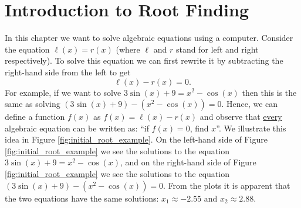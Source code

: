 \section{Introduction to Root Finding}
In this chapter we want to solve algebraic equations using a computer.  Consider the equation
$\ell(x) = r(x)$ (where $\ell$ and $r$ stand for left and right respectively).  To solve
this equation we can first rewrite it by subtracting the right-hand side from the left to
get
\[ \ell(x) - r(x) = 0. \]
For example, if we want to solve $3\sin(x) + 9 = x^2 - \cos(x)$ then this is the same as
solving $(3\sin(x) + 9 ) - (x^2 - \cos(x)) = 0$.  Hence, we can define a function $f(x)$
as $f(x)=\ell(x)-r(x)$
and observe that \underline{every} algebraic equation can be written as: ``if $f(x) = 0$,
find $x$''.  We illustrate this idea in Figure \ref{fig:initial_root_example}.  On the
left-hand side of Figure \ref{fig:initial_root_example} we see the solutions to the
equation $3\sin(x) + 9 = x^2 - \cos(x)$, and on the right-hand side of Figure
\ref{fig:initial_root_example} we see the solutions to the equation $\left( 3\sin(x)+9
\right) - \left( x^2 - \cos(x) \right) = 0$.  From the plots it is apparent that the two
equations have the same solutions: $x_1 \approx -2.55$ and $x_2 \approx 2.88$.

